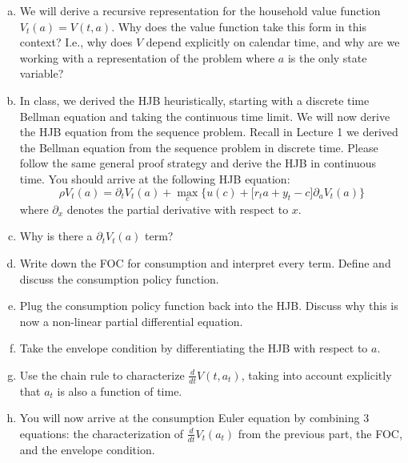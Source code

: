 \documentclass[11pt]{extarticle}
\theoremstyle{plain}
\theoremstyle{definition}
\begin{document}
\vspace{2mm}
\begin{enumerate}[(a)] 
\item We will derive a recursive representation for the household value function $V_t(a) = V(t, a)$. Why does the value function take this form in this context? I.e., why does $V$ depend explicitly on calendar time, and why are we working with a representation of the problem where $a$ is the only state variable?

\item In class, we derived the HJB heuristically, starting with a discrete time Bellman equation and taking the continuous time limit. We will now derive the HJB equation from the sequence problem. Recall in Lecture 1 we derived the Bellman equation from the sequence problem in discrete time. Please follow the same general proof strategy and derive the HJB in continuous time. You should arrive at the following HJB equation: 
\begin{equation*}
	\rho V_t(a) = \partial_t V_t(a) + \max_c \bigg\{ u(c) + \Big[ r_t a + y_t - c \Big] \partial_a V_t(a) \bigg\}
\end{equation*}
where $\partial_x$ denotes the partial derivative with respect to $x$. 

\item Why is there a $\partial_t V_t(a)$ term? 

\item Write down the FOC for consumption and interpret every term. Define and discuss the consumption policy function. 

\item Plug the consumption policy function back into the HJB. Discuss why this is now a non-linear partial differential equation. 
	
\item Take the envelope condition by differentiating the HJB with respect to $a$. 

\item Use the chain rule to characterize $\frac{d}{dt} V(t, a_t)$, taking into account explicitly that $a_t$ is also a function of time. 

\item You will now arrive at the consumption Euler equation by combining 3 equations: the characterization of $\frac{d}{dt} V_t(a_t)$ from the previous part, the FOC, and the envelope condition.

\end{enumerate}
\end{document}
